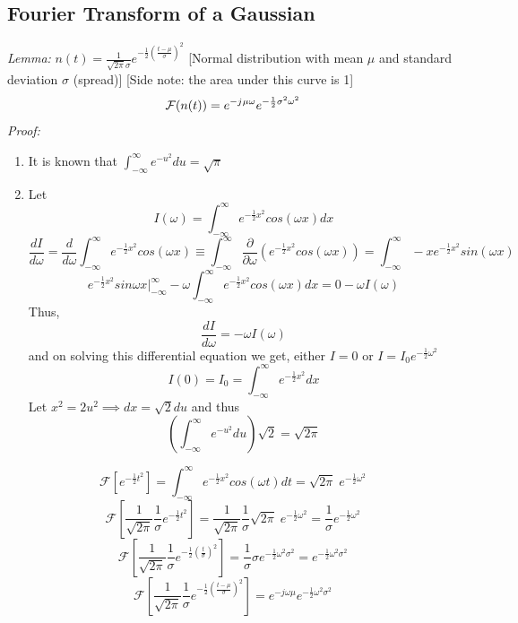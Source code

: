 \documentclass[11pt]{article}
\theoremstyle{definition}
\newcommand{\iu}{{j\mkern1mu}}
\newcommand{\F}{{\mathcal{F}}}
\begin{document}
\subsection{Fourier Transform of a Gaussian}
\textit{Lemma:} $n(t) = \frac{1}{\sqrt{2\pi} \sigma} e^{-\frac{1}{2}(\frac{t-\mu}{\sigma})^2}$  [Normal distribution with mean $\mu$ and standard deviation $\sigma$ (spread)] [Side note: the area under this curve is 1]
$$\F(n(t)) = e^{-\iu \mu \omega} e^{-\frac{1}{2} \sigma^2 \omega^2}$$
\textit{Proof:} 
\begin{enumerate}[]
    \item It is known that $\int^{\infty}_{-\infty} e^{-u^2} du = \sqrt{\pi}$
    \item Let $$I(\omega) = \int^{\infty}_{-\infty} e^{-\frac{1}{2}x^2}cos(\omega x) dx $$
    $$\frac{dI}{d\omega} = \frac{d}{d\omega} \int^{\infty}_{-\infty} e^{-\frac{1}{2}x^2}cos(\omega x) \equiv \int^{\infty}_{-\infty} \frac{\partial}{\partial\omega}( e^{-\frac{1}{2}x^2}cos(\omega x)) = \int^{\infty}_{-\infty} -xe^{-\frac{1}{2}x^2}sin(\omega x)$$
    $$e^{-\frac{1}{2}x^2} sin\omega x |^\infty_{-\infty} -\omega\int^{\infty}_{-\infty}e^{-\frac{1}{2}x^2}cos(\omega x) dx = 0 - \omega I(\omega)$$
    Thus,
    $$\frac{dI}{d\omega} = -\omega I(\omega)$$ and on solving this differential equation we get, 
    either $I = 0$ or $I = I_0e^{-\frac{1}{2}\omega^2}$\\
    $$I(0) = I_0 = \int^{\infty}_{-\infty}e^{-\frac{1}{2}x^2}dx $$
    Let $x^2 = 2u^2 \implies dx = \sqrt{2} du$ and thus 
    $$(\int^{\infty}_{-\infty} e^{-u^2}du)\sqrt{2} = \sqrt{2\pi}$$
\end{enumerate}
$$\F[e^{-\frac{1}{2}t^2}] = \int_{-\infty}^\infty e^{-\frac{1}{2}x^2}cos(\omega t) dt = \sqrt{2\pi}\;e^{-\frac{1}{2}\omega^2}$$
$$\F[\frac{1}{\sqrt{2\pi}} \frac{1}{\sigma} e^{-\frac{1}{2}t^2}] = \frac{1}{\sqrt{2\pi}} \frac{1}{\sigma} \sqrt{2\pi}\;e^{-\frac{1}{2}\omega^2} = \frac{1}{\sigma}e^{-\frac{1}{2}\omega^2}$$
$$\F[\frac{1}{\sqrt{2\pi}} \frac{1}{\sigma} e^{-\frac{1}{2}(\frac{t}{\sigma})^2}] = \frac{1}{\sigma}\sigma e^{-\frac{1}{2}\omega^2\sigma^2} = e^{-\frac{1}{2}\omega^2\sigma^2}$$
$$\F[\frac{1}{\sqrt{2\pi}} \frac{1}{\sigma} e^{-\frac{1}{2}(\frac{t-\mu}{\sigma})^2}]  = e^{-j\omega \mu}e^{-\frac{1}{2}\omega^2\sigma^2}$$
\end{document}
